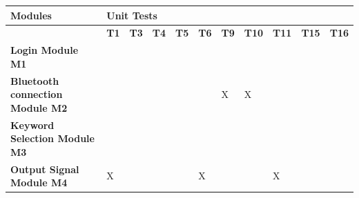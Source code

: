 \documentclass[12pt, titlepage]{article}
\begin{document}
\begin{table}[H]
  \centering
  \begin{tabular}{|p{2.5cm}|llllllllll|}
  \hline
  \textbf{Modules}                           & \multicolumn{10}{l|}{\textbf{Unit Tests}}                                                                                                                                                                                                                                                                                                  \\ \hline
                                              & \multicolumn{1}{l|}{\textbf{T1}} & \multicolumn{1}{l|}{\textbf{T3}} & \multicolumn{1}{l|}{\textbf{T4}} & \multicolumn{1}{l|}{\textbf{T5}} & \multicolumn{1}{l|}{\textbf{T6}} & \multicolumn{1}{l|}{\textbf{T9}} & \multicolumn{1}{l|}{\textbf{T10}} & \multicolumn{1}{l|}{\textbf{T11}} & \multicolumn{1}{l|}{\textbf{T15}} & \textbf{T16} \\ \hline
  \textbf{Login Module M1}                   & \multicolumn{1}{l|}{}            & \multicolumn{1}{l|}{}            & \multicolumn{1}{l|}{}            & \multicolumn{1}{l|}{}            & \multicolumn{1}{l|}{}            & \multicolumn{1}{l|}{}            & \multicolumn{1}{l|}{}             & \multicolumn{1}{l|}{}             & \multicolumn{1}{l|}{}             &              \\ \hline
  \textbf{Bluetooth connection Module M2}    & \multicolumn{1}{l|}{}            & \multicolumn{1}{l|}{}            & \multicolumn{1}{l|}{}            & \multicolumn{1}{l|}{}            & \multicolumn{1}{l|}{}            & \multicolumn{1}{l|}{X}           & \multicolumn{1}{l|}{X}            & \multicolumn{1}{l|}{}             & \multicolumn{1}{l|}{}             &              \\ \hline
  \textbf{Keyword Selection Module M3}       & \multicolumn{1}{l|}{}            & \multicolumn{1}{l|}{}            & \multicolumn{1}{l|}{}            & \multicolumn{1}{l|}{}            & \multicolumn{1}{l|}{}            & \multicolumn{1}{l|}{}            & \multicolumn{1}{l|}{}             & \multicolumn{1}{l|}{}             & \multicolumn{1}{l|}{}             &              \\ \hline
  \textbf{Output Signal Module M4}           & \multicolumn{1}{l|}{X}           & \multicolumn{1}{l|}{}            & \multicolumn{1}{l|}{}            & \multicolumn{1}{l|}{}            & \multicolumn{1}{l|}{X}           & \multicolumn{1}{l|}{}            & \multicolumn{1}{l|}{}             & \multicolumn{1}{l|}{X}            & \multicolumn{1}{l|}{}             &              \\ \hline

\end{tabular}
\end{table}
\end{document}
